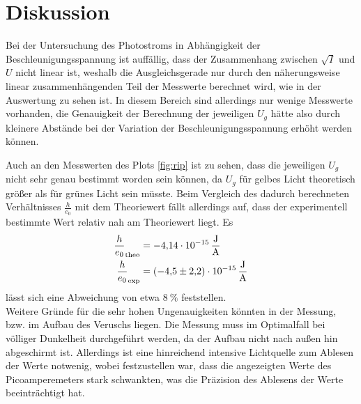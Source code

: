 \section{Diskussion}
\label{sec:Diskussion}

Bei der Untersuchung des Photostroms in Abhängigkeit der Beschleunigungsspannung ist auffällig, dass der Zusammenhang zwischen $\sqrt{I} $
und $U$ nicht linear ist, weshalb die Ausgleichsgerade nur durch den näherungsweise linear zusammenhängenden Teil der Messwerte berechnet 
wird, wie in der Auswertung zu sehen ist. In diesem Bereich sind allerdings nur wenige Messwerte vorhanden, die Genauigkeit der Berechnung 
der jeweiligen $U_g$ hätte also durch kleinere Abstände bei der Variation der Beschleunigungsspannung erhöht werden können. 

Auch an den Messwerten des Plots \ref{fig:rip} ist zu sehen, dass die jeweiligen $U_g$ nicht sehr genau bestimmt worden sein können, da 
$U_g$ für gelbes Licht theoretisch größer als für grünes Licht sein müsste. Beim Vergleich des dadurch berechneten Verhältnisses $\frac{h}{e_0}$
mit dem Theoriewert fällt allerdings auf, dass der experimentell bestimmte Wert relativ nah am Theoriewert liegt. Es 
\begin{align*}
    \frac{h}{e_0}_\text{theo} &= \SI{-4.14e-15}{\frac{\joule}{\ampere}} \\
    \frac{h}{e_0}_\text{exp}  &= \SI{-4.5(22)e-15}{\frac{\joule}{\ampere}}
\end{align*}
lässt sich eine Abweichung von etwa $\SI{8}{\percent} $ feststellen. 
\\ Weitere Gründe für die sehr hohen Ungenauigkeiten könnten in der Messung, bzw. im Aufbau des Veruschs liegen. Die Messung muss im 
Optimalfall bei völliger Dunkelheit durchgeführt werden, da der Aufbau nicht nach außen hin abgeschirmt ist. Allerdings ist eine hinreichend
intensive Lichtquelle zum Ablesen der Werte notwenig, wobei festzustellen war, dass die angezeigten Werte des Picoamperemeters stark 
schwankten, was die Präzision des Ablesens der Werte beeinträchtigt hat. 